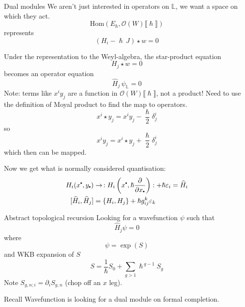     \begin{frame}{Dual modules}
    We aren't just interested in operators on \( \mathbb{L}\), we want a space on which they act.
    \[ \mathrm{Hom} ( E_{\hslash}, \mathcal{O}(W)\lBrack \hslash \rBrack)\] 
    represents 
    \[ (H_i - \hslash \,J) \star w = 0\]
    \end{frame}
    



    \begin{frame}
    Under the representation to the Weyl-algebra, the star-product equation 
    \[ H_j \star w = 0 \]
    becomes an operator equation
    \[ \widehat{H}_j\, \psi_{\mathbb{L}}  = 0\]
    Note: terms like \(x^i y_j\) are a function in \(\mathcal{O}(W)\lBrack \hslash \rBrack\), not a product! Need to use the definition of Moyal product to find the map to operators.
    \[  x^i \star y_j = x^i y_j - \frac{\hslash}{2} \delta_{j}^i \]
    so 
    \[ x^i y_j = x^i \star y_j  +\frac{\hslash}{2} \delta_{j}^i\]
    which then can be mapped.
    
    \end{frame}
    
    \begin{frame}
    Now we get what is normally considered quantisation:
    \begin{align*}
     H_i(x^{\sbt},y_{\sbt}) &\rightarrow \,: H_i \left( x^{\sbt} , \hslash \frac{\partial}{\partial x_{\sbt}} \right) : + \hslash \varepsilon_i = \widehat{H}_i\\
         [\widehat{H}_i , \widehat{H}_j ] &= \{ H_i , H_j \} +\hslash g_{ij}^k \varepsilon_k
    \end{align*}
    \end{frame}


   
    
    \begin{frame}{Abstract topological recursion}
        Looking for a wavefunction \( \psi \) such that
        \[ \widehat{H}_j \psi = 0\]
        where 
        \[\psi = \exp \left( S \right) \]
        and WKB expansion of \(S\)
        \[ S=\frac{1}{\hslash} S_0 + \sum_{g>1} \hslash^{\,g-1} S_g\]
        Note \( S_{g,n;i} = \partial_i S_{g,n}\) (chop off an \(x\) leg).
    \end{frame}
    
    \begin{frame}{Recall}
    Wavefunction is looking for a dual module on formal completion. 
    \end{frame}
    

